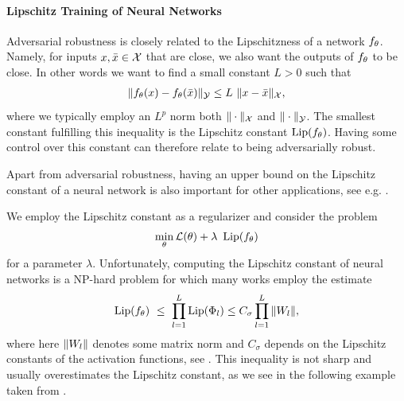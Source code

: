 \paragraph{Lipschitz Training of Neural Networks}
%
Adversarial robustness is closely related to the Lipschitzness of a network $f_\theta$. Namely, for inputs $x,\bar{x}\in\mathcal{X}$ that are close, we also want the outputs of $f_\theta$ to be close. In other words we want to find a small constant $L>0$ such that
%
\begin{align*}
\norm{\net_\param(\inp) - \net_\param(\inpp)}_\Oup \leq L\ \norm{\inp-\inpp}_\Inp,
\end{align*}
%
where we typically employ an $L^p$ norm both $\|\cdot\|_{\mathcal{X}}$ and $\|\cdot\|_{\mathcal{\mathcal{Y}}}$.
%
The smallest constant fulfilling this inequality is the Lipschitz constant $\operatorname*{Lip}(f_\theta)$. Having some control over this constant can therefore relate to being adversarially robust.
%
\begin{remark}{}{}
Apart from adversarial robustness, having an upper bound on the Lipschitz constant of a neural network is also important for other applications, see e.g. \cite{hasannasab2020parseval, arjovsky2017wasserstein}.
\end{remark}
%
%
We employ the Lipschitz constant as a regularizer and consider the problem
%
\begin{align}\label{eq:LipReg}
\min_\theta \mathcal{L}(\theta) +\lambda\ \operatorname*{Lip}(f_\theta)
\end{align}
%
for a parameter $\lambda$. Unfortunately, computing the Lipschitz constant of neural networks is a NP-hard problem \cite{scaman2018lipschitz} for which many works employ the estimate
%
\begin{align}\label{ineq:lip_weights}
\operatorname{Lip}(f_\theta) \ \leq \ \prod_{l=1}^L  \operatorname{Lip}(\Phi_l) \leq 
C_\sigma \prod_{l=1}^L \|W_l\|,
\end{align}
%
where here $\|W_l\|$ denotes some matrix norm and $C_\sigma$ depends on the Lipschitz constants of the activation functions, see \cite{Anil2019,gouk2020regularisation, Krishnan2020, Roth2020}.
%
This inequality is not sharp and usually overestimates the Lipschitz constant, as we see in the following example taken from \cite{bungert2021clip}.
%
